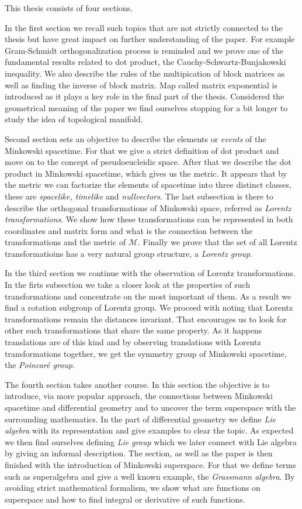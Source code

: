 \documentclass[12pt]{article}
\theoremstyle{plain}
\theoremstyle{definition}
\numberwithin{equation}{section}
\def\M{{\mathcal M}}
\begin{document}
This thesis consists of four sections.

In the first section we recall such topics that are not 
strictly connected to the thesis but have great impact 
on further understanding of the paper. For example 
Gram-Schmidt orthogonalization process is reminded and we 
prove one of the fundamental results related to dot 
product, the Cauchy-Schwartz-Bunjakowski inequality. 
We also describe the rules of the multipication of 
block matrices as well as finding the inverse of block 
matrix. Map called matrix exponential is introduced as 
it plays a key role in the final part of the thesis. 
Considered the geometrical meaning of the paper we find 
ourselves stopping for a bit longer to study the idea 
of topological manifold.

Second section sets an objective to describe the elements 
or \emph{events} of the Minkowski spacetime. For that we 
give a strict definition of dot product and move on to 
the concept of pseudoeucleidic space. After that we 
describe the dot product in Minkowski spacetime, which 
gives us the metric. It appears that by the metric we can 
factorize the elements of spacetime into three distinct 
classes, these are \emph{spacelike, timelike} and 
\emph{nullvectors}. The last subsection is there to 
describe the orthogonal transformations of Minkowski space, 
referred as \emph{Lorentz transformations}. We show how these 
transformations can be represented in both coordinates and 
matrix form and what is the connection between the 
transformations and the metric of $\M$. Finally we prove 
that the set of all Lorentz transformatioins has a very 
natural group structure, a \emph{Lorentz group}.

In the third section we continue with the observation 
of Lorentz transformations. In the firts subsection we 
take a closer look at the properties of such 
transformations and concentrate on the most important of 
them. As a result we find a rotation subgroup of Lorentz 
group. We proceed with noting that Lorentz transformations 
remain the distances invariant. That encourages us to 
look for other such transformations that share the same 
property. As it happens translations are of this kind and 
by observing translations with Lorentz transformations 
together, we get the symmetry group of Minkowski spacetime, 
the \emph{Poincar\'e group}.

The fourth section takes another course. In this section 
the objective is to introduce, via more popular approach, 
the connections between Minkowski spacetime and 
differential geometry and to uncover the term superspace 
with the surrounding mathematics. In the part of 
differential geometry we define \emph{Lie algebra} with 
its representation and give examples to 
clear the topic. As expected we then find ourselves 
defining \emph{Lie group} which we later connect with 
Lie algebra by giving an informal description. The section,
as well as the paper is then finished with the 
introduction of Minkowski superspace. For that we define 
terms such as superalgebra and give a well known example, 
the \emph{Grassmann algebra}. By avoiding strict 
mathematical formalism, we show what are functions on 
superspace and how to find integral or derivative of such 
functions.


\newpage

%

\end{document}
